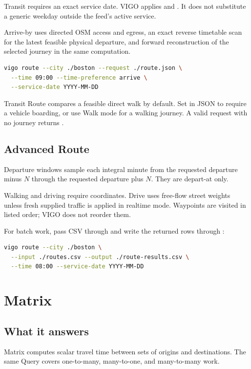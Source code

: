 \documentclass[10pt,letterpaper]{article}
\begin{document}
Transit requires an exact service date. VIGO applies  and . It does not substitute a generic weekday outside the feed's active service.

Arrive-by uses directed OSM access and egress, an exact reverse timetable scan for the latest feasible physical departure, and forward reconstruction of the selected journey in the same computation.

\begin{lstlisting}[language=bash]
vigo route --city ./boston --request ./route.json \
  --time 09:00 --time-preference arrive \
  --service-date YYYY-MM-DD
\end{lstlisting}

Transit Route compares a feasible direct walk by default. Set  in JSON to require a vehicle boarding, or use Walk mode for a walking journey. A valid request with no journey returns .

\subsection{Advanced Route}

Departure windows sample each integral minute from the requested departure minus $N$ through the requested departure plus $N$. They are depart-at only.

Walking and driving require coordinates. Drive uses free-flow street weights unless fresh supplied traffic is applied in realtime mode. Waypoints are visited in listed order; VIGO does not reorder them.

For batch work, pass CSV through \field{--input} and write the returned rows through \field{--output}:

\begin{lstlisting}[language=bash]
vigo route --city ./boston \
  --input ./routes.csv --output ./route-results.csv \
  --time 08:00 --service-date YYYY-MM-DD
\end{lstlisting}

\section{Matrix}

\subsection{What it answers}

Matrix computes scalar travel time between sets of origins and destinations. The same Query covers one-to-many, many-to-one, and many-to-many work.
\end{document}
